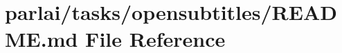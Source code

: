 \hypertarget{parlai_2tasks_2opensubtitles_2README_8md}{}\section{parlai/tasks/opensubtitles/\+R\+E\+A\+D\+ME.md File Reference}
\label{parlai_2tasks_2opensubtitles_2README_8md}
